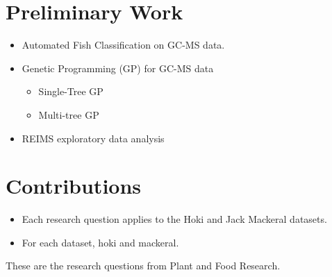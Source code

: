 \documentclass{article}
\begin{document}
\section{Preliminary Work}
\label{sec:preliminary}

\begin{itemize}
  \item Automated Fish Classification on GC-MS data. 
  \item Genetic Programming (GP) for GC-MS data 
  \begin{itemize}
    \item Single-Tree GP 
    \item Multi-tree GP 
  \end{itemize}
  \item REIMS exploratory data analysis 
\end{itemize}

\section{Contributions}
\label{sec:contributions}

\begin{itemize}
  \item Each research question applies to the Hoki and Jack Mackeral datasets. 
  \item For each dataset, hoki and mackeral. 
\end{itemize}

These are the research questions from Plant and Food Research. 
\end{document}
